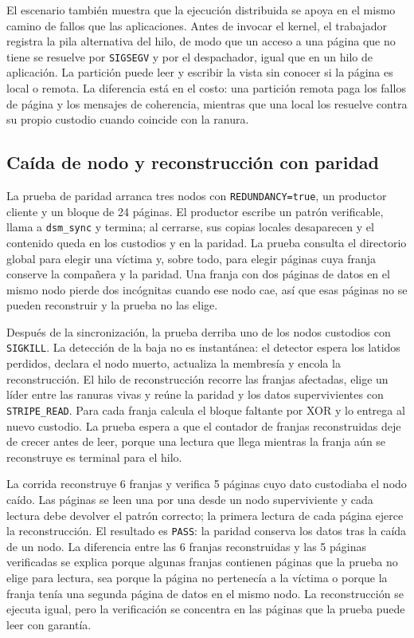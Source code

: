 El escenario también muestra que la ejecución distribuida se apoya en el mismo camino de fallos que las aplicaciones. Antes de invocar el kernel, el trabajador registra la pila alternativa del hilo, de modo que un acceso a una página que no tiene se resuelve por \texttt{SIGSEGV} y por el despachador, igual que en un hilo de aplicación. La partición puede leer y escribir la vista sin conocer si la página es local o remota. La diferencia está en el costo: una partición remota paga los fallos de página y los mensajes de coherencia, mientras que una local los resuelve contra su propio custodio cuando coincide con la ranura.

\subsection{Caída de nodo y reconstrucción con paridad}

La prueba de paridad arranca tres nodos con \texttt{REDUNDANCY=true}, un productor cliente y un bloque de 24 páginas. El productor escribe un patrón verificable, llama a \texttt{dsm\_sync} y termina; al cerrarse, sus copias locales desaparecen y el contenido queda en los custodios y en la paridad. La prueba consulta el directorio global para elegir una víctima y, sobre todo, para elegir páginas cuya franja conserve la compañera y la paridad. Una franja con dos páginas de datos en el mismo nodo pierde dos incógnitas cuando ese nodo cae, así que esas páginas no se pueden reconstruir y la prueba no las elige.

Después de la sincronización, la prueba derriba uno de los nodos custodios con \texttt{SIGKILL}. La detección de la baja no es instantánea: el detector espera los latidos perdidos, declara el nodo muerto, actualiza la membresía y encola la reconstrucción. El hilo de reconstrucción recorre las franjas afectadas, elige un líder entre las ranuras vivas y reúne la paridad y los datos supervivientes con \texttt{STRIPE\_READ}. Para cada franja calcula el bloque faltante por XOR y lo entrega al nuevo custodio. La prueba espera a que el contador de franjas reconstruidas deje de crecer antes de leer, porque una lectura que llega mientras la franja aún se reconstruye es terminal para el hilo.

La corrida reconstruye 6 franjas y verifica 5 páginas cuyo dato custodiaba el nodo caído. Las páginas se leen una por una desde un nodo superviviente y cada lectura debe devolver el patrón correcto; la primera lectura de cada página ejerce la reconstrucción. El resultado es \texttt{PASS}: la paridad conserva los datos tras la caída de un nodo. La diferencia entre las 6 franjas reconstruidas y las 5 páginas verificadas se explica porque algunas franjas contienen páginas que la prueba no elige para lectura, sea porque la página no pertenecía a la víctima o porque la franja tenía una segunda página de datos en el mismo nodo. La reconstrucción se ejecuta igual, pero la verificación se concentra en las páginas que la prueba puede leer con garantía.

